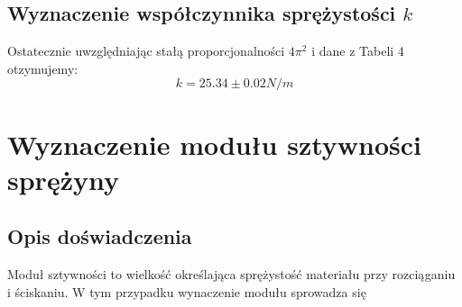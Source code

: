\documentclass{article} %
\begin{document}
\subsection{Wyznaczenie współczynnika sprężystości $k$}
Ostatecznie uwzględniając stałą proporcjonalności $4\pi^2$ i dane z Tabeli 4 otzymujemy:
{\large
\begin{equation}
    k = 25.34\pm0.02N/m
\end{equation}
}
\section{Wyznaczenie modułu sztywności sprężyny}
\subsection{Opis doświadczenia}
Moduł sztywności to wielkość określająca sprężystość materiału przy rozciąganiu i ściskaniu. W tym przypadku wynaczenie modułu sprowadza się
\begin{comment}
\subsection{Opis doświadczenia}
\subsection{Wyprowadzenie wzorów}
\subsection{Niepewność pomiarowa}
\subsection{Wyniki pomiarów}
\subsection{Wyniki doświadczenia}
\subsection{Wyznaczenie współczynnika sprężystości $k$}
\end{comment}
\end{document}
